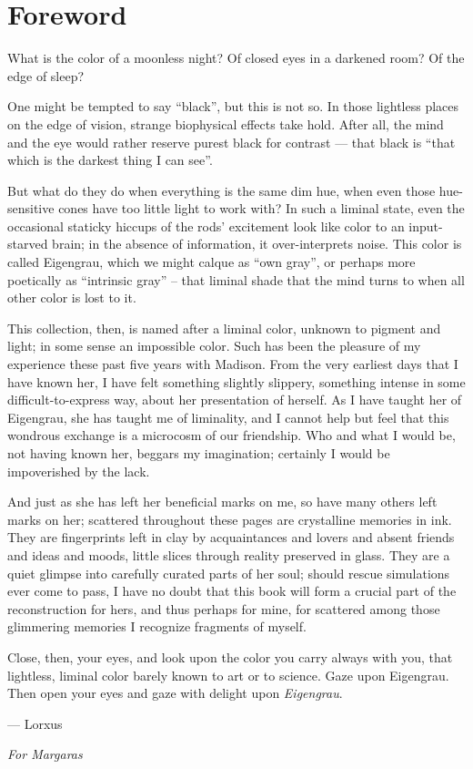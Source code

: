 \chapter{Foreword}

What is the color of a moonless night? Of closed eyes in a darkened room? Of the edge of sleep?

One might be tempted to say ``black'', but this is not so. In those lightless places on the edge of vision, strange biophysical effects take hold. After all, the mind and the eye would rather reserve purest black for contrast --- that black is ``that which is the darkest thing I can see''.

But what do they do when everything is the same dim hue, when even those hue-sensitive cones have too little light to work with? In such a liminal state, even the occasional staticky hiccups of the rods' excitement look like color to an input-starved brain; in the absence of information, it over-interprets noise. This color is called Eigengrau, which we might calque as ``own gray'', or perhaps more poetically as ``intrinsic gray'' – that liminal shade that the mind turns to when all other color is lost to it.

This collection, then, is named after a liminal color, unknown to pigment and light; in some sense an impossible color. Such has been the pleasure of my experience these past five years with Madison. From the very earliest days that I have known her, I have felt something slightly slippery, something intense in some difficult-to-express way, about her presentation of herself. As I have taught her of Eigengrau, she has taught me of liminality, and I cannot help but feel that this wondrous exchange is a microcosm of our friendship. Who and what I would be, not having known her, beggars my imagination; certainly I would be impoverished by the lack.

And just as she has left her beneficial marks on me, so have many others left marks on her; scattered throughout these pages are crystalline memories in ink. They are fingerprints left in clay by acquaintances and lovers and absent friends and ideas and moods, little slices through reality preserved in glass. They are a quiet glimpse into carefully curated parts of her soul; should rescue simulations ever come to pass, I have no doubt that this book will form a crucial part of the reconstruction for hers, and thus perhaps for mine, for scattered among those glimmering memories I recognize fragments of myself.

Close, then, your eyes, and look upon the color you carry always with you, that lightless, liminal color barely known to art or to science. Gaze upon Eigengrau. Then open your eyes and gaze with delight upon \emph{Eigengrau}.

\vspace{1.5ex}
\noindent --- Lorxus

\newpage
\thispagestyle{empty}
\null
\vfill
\begin{center}
    \emph{For Margaras}
\end{center}
\vfill
